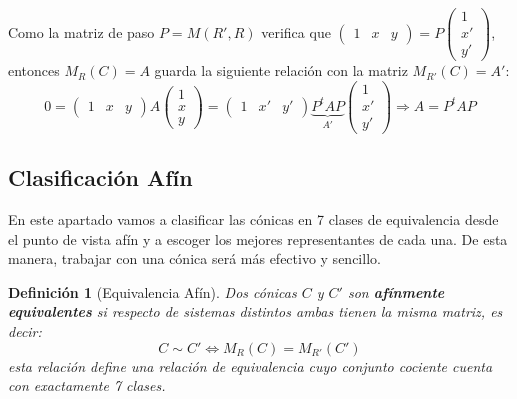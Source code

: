 \documentclass[10pt,a4paper,openright]{book}
\theoremstyle{break}
\newtheorem*{defi}{Definición}
\begin{document}
Como la matriz de paso $P = M (R', R)$ verifica que $\begin{pmatrix}
1 & x & y \end{pmatrix} = P \begin{pmatrix} 1 \\ x' \\ y' \end{pmatrix}$, entonces $M_R(C) = A$ guarda la siguiente relación con la matriz $M_{R'}(C) = A'$:
$$0 = \begin{pmatrix}
1 & x & y
\end{pmatrix} A \begin{pmatrix}
1 \\ x \\ y
\end{pmatrix} = \begin{pmatrix}
1 & x' & y'
\end{pmatrix}  \underbrace{P^t A P}_{A'} \begin{pmatrix}
1 \\ x' \\ y'
\end{pmatrix} \Rightarrow A = P^tAP$$

\subsection{Clasificación Afín}
En este apartado vamos a clasificar las cónicas en 7 clases de equivalencia desde el punto de vista afín y a escoger los mejores representantes de cada una. De esta manera, trabajar con una cónica será más efectivo y sencillo.

\begin{defi}[Equivalencia Afín]
Dos cónicas $C$ y $C'$ son \textbf{afínmente equivalentes} si respecto de sistemas distintos ambas tienen la misma matriz, es decir:
$$C \sim C' \Leftrightarrow M_R (C) = M_{R'} (C')$$
esta relación define una relación de equivalencia cuyo conjunto cociente cuenta con exactamente 7 clases.
\end{defi}
\end{document}
